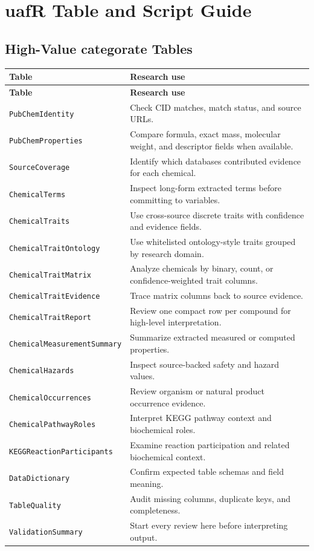 \chapter{uafR Table and Script Guide}

\section{High-Value categorate Tables}
\begin{longtable}{p{}p{}}
\toprule
\textbf{Table} & \textbf{Research use}\\
\midrule
\endfirsthead
\toprule
\textbf{Table} & \textbf{Research use}\\
\midrule
\endhead
\texttt{PubChemIdentity} & Check CID matches, match status, and source URLs.\\
\texttt{PubChemProperties} & Compare formula, exact mass, molecular weight, and descriptor fields when available.\\
\texttt{SourceCoverage} & Identify which databases contributed evidence for each chemical.\\
\texttt{ChemicalTerms} & Inspect long-form extracted terms before committing to variables.\\
\texttt{ChemicalTraits} & Use cross-source discrete traits with confidence and evidence fields.\\
\texttt{ChemicalTraitOntology} & Use whitelisted ontology-style traits grouped by research domain.\\
\texttt{ChemicalTraitMatrix} & Analyze chemicals by binary, count, or confidence-weighted trait columns.\\
\texttt{ChemicalTraitEvidence} & Trace matrix columns back to source evidence.\\
\texttt{ChemicalTraitReport} & Review one compact row per compound for high-level interpretation.\\
\texttt{ChemicalMeasurementSummary} & Summarize extracted measured or computed properties.\\
\texttt{ChemicalHazards} & Inspect source-backed safety and hazard values.\\
\texttt{ChemicalOccurrences} & Review organism or natural product occurrence evidence.\\
\texttt{ChemicalPathwayRoles} & Interpret KEGG pathway context and biochemical roles.\\
\texttt{KEGGReactionParticipants} & Examine reaction participation and related biochemical context.\\
\texttt{DataDictionary} & Confirm expected table schemas and field meaning.\\
\texttt{TableQuality} & Audit missing columns, duplicate keys, and completeness.\\
\texttt{ValidationSummary} & Start every review here before interpreting output.\\
\bottomrule
\end{longtable}

